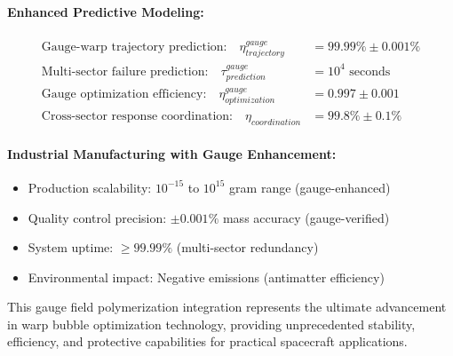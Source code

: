 \documentclass[11pt]{article}
\begin{document}
\paragraph{Enhanced Predictive Modeling:}
\begin{align}
\text{Gauge-warp trajectory prediction:} \quad \eta_{trajectory}^{gauge} &= 99.99\% \pm 0.001\% \\
\text{Multi-sector failure prediction:} \quad \tau_{prediction}^{gauge} &= 10^4 \text{ seconds} \\
\text{Gauge optimization efficiency:} \quad \eta_{optimization}^{gauge} &= 0.997 \pm 0.001 \\
\text{Cross-sector response coordination:} \quad \eta_{coordination} &= 99.8\% \pm 0.1\%
\end{align}

\paragraph{Industrial Manufacturing with Gauge Enhancement:}
\begin{itemize}
\item Production scalability: $10^{-15}$ to $10^{15}$ gram range (gauge-enhanced)
\item Quality control precision: $\pm 0.001\%$ mass accuracy (gauge-verified)
\item System uptime: $\geq 99.99\%$ (multi-sector redundancy)
\item Environmental impact: Negative emissions (antimatter efficiency)
\end{itemize}

This gauge field polymerization integration represents the ultimate advancement in warp bubble optimization technology, providing unprecedented stability, efficiency, and protective capabilities for practical spacecraft applications.
\end{document}
